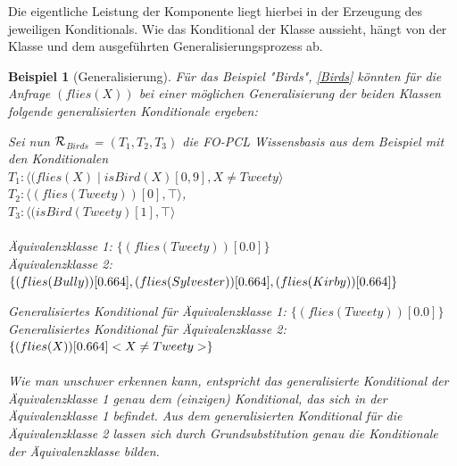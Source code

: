 \documentclass[a4paper, 11pt]{book}
\newtheorem{Bsp}{Beispiel}[section]
\begin{document}
Die eigentliche Leistung der Komponente liegt hierbei in der Erzeugung des jeweiligen Konditionals. Wie das Konditional der Klasse aussieht, hängt von der Klasse und dem ausgeführten Generalisierungsprozess ab. 
\begin{Bsp}[Generalisierung]\label{Bsp:Generalisierung}
Für das Beispiel "{}Birds"{}, \ref{Birds} könnten für die Anfrage $ (flies(X)) $ bei einer möglichen Generalisierung der beiden Klassen folgende generalisierten Konditionale ergeben: 


\noindent
Sei nun $ \cal{R} $$_{Birds}  $ = $ (T_1, T_2, T_3)  $ die FO-PCL Wissensbasis aus dem Beispiel mit den Konditionalen
\\
$ T_{1} : \langle (flies(X) \mid isBird(X)[0,9], X \neq Tweety \rangle$\\	
$ T_{2}  :  \langle (flies(Tweety))[0], \top \rangle $,\\
$ T_{3} : \langle (isBird(Tweety) [1], \top \rangle$\\
\\
Äquivalenzklasse 1: $\{(flies(Tweety))[0.0]\}$\\
Äquivalenzklasse 2: $\{(flies(Bully))[0.664], (flies(Sylvester))[0.664], \\(flies(Kirby))[0.664]\}$

\noindent
Generalisiertes Konditional für Äquivalenzklasse 1: $\{(flies(Tweety))[0.0]\}$\\
Generalisiertes Konditional für Äquivalenzklasse 2: $\{(flies(X))[0.664] \\ <X\neq Tweety>\}$\\
\\
Wie man unschwer erkennen kann, entspricht das generalisierte Konditional der Äquivalenzklasse 1 genau dem (einzigen) Konditional, das sich in der Äquivalenzklasse 1 befindet.
Aus dem generalisierten Konditional für die Äquivalenzklasse 2 lassen sich durch Grundsubstitution genau die Konditionale der Äquivalenzklasse bilden.
\end{Bsp}
\end{document}
